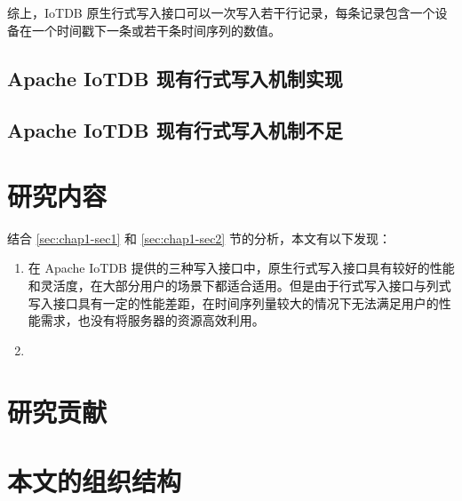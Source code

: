 综上，IoTDB 原生行式写入接口可以一次写入若干行记录，每条记录包含一个设备在一个时间戳下一条或若干条时间序列的数值。
\subsection{Apache IoTDB 现有行式写入机制实现}
\subsection{Apache IoTDB 现有行式写入机制不足}

\section{研究内容}
结合 \ref{sec:chap1-sec1} 和 \ref{sec:chap1-sec2} 节的分析，本文有以下发现：
\begin{enumerate}
  \item 在 Apache IoTDB 提供的三种写入接口中，原生行式写入接口具有较好的性能和灵活度，在大部分用户的场景下都适合适用。但是由于行式写入接口与列式写入接口具有一定的性能差距，在时间序列量较大的情况下无法满足用户的性能需求，也没有将服务器的资源高效利用。
  \item 
\end{enumerate}
\section{研究贡献}
\section{本文的组织结构}